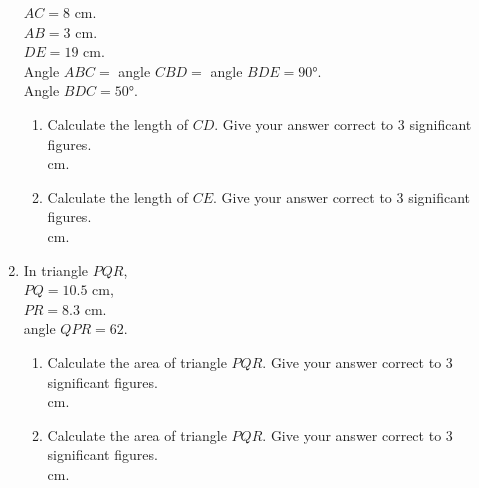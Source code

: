 \begin{enumerate}
\begin{figure}[H]
  \end{figure}
  $AC = 8$ cm.\\
  $AB = 3$ cm.\\
  $DE = 19$ cm.\\
  Angle $ABC = $ angle $CBD =$ angle $BDE = \ang{90}$.\\
  Angle $BDC = \ang{50}$.
  \begin{enumerate}
    \item Calculate the length of $CD$. Give your answer correct to 3 significant figures.\\[2.5cm]\vspace*{0pt}\hfill\dline cm.
    \item Calculate the length of $CE$. Give your answer correct to 3 significant figures.\\[2.5cm]\vspace*{0pt}\hfill\dline cm.
  \end{enumerate}
  \newpage
  \item \mbox{}
  \begin{figure}[H]
    \centering
  \end{figure}
  In triangle $PQR$,\\
  $PQ = 10.5$ cm,\\
  $PR = 8.3$ cm.\\
  angle $QPR = 62$.
  \begin{enumerate}
    \item Calculate the area of triangle $PQR$. Give your answer correct to 3 significant figures.\\[2cm]\vspace*{0pt}\hfill\dline cm.
    \item Calculate the area of triangle $PQR$. Give your answer correct to 3 significant figures.\\[2cm]\vspace*{0pt}\hfill\dline cm.
  \end{enumerate}
\end{enumerate}